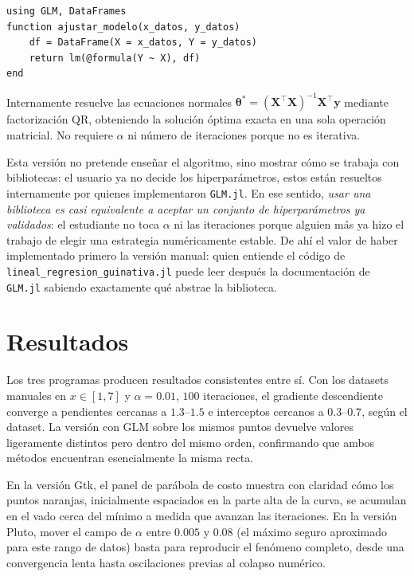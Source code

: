 \documentclass[11pt,a4paper]{article}
\begin{document}
\begin{lstlisting}
using GLM, DataFrames
function ajustar_modelo(x_datos, y_datos)
    df = DataFrame(X = x_datos, Y = y_datos)
    return lm(@formula(Y ~ X), df)
end
\end{lstlisting}

Internamente resuelve las ecuaciones normales $\boldsymbol{\theta}^{*} = (\mathbf{X}^{\top}\mathbf{X})^{-1}\mathbf{X}^{\top}\mathbf{y}$ mediante factorizaci\'on QR, obteniendo la soluci\'on \'optima exacta en una sola operaci\'on matricial. No requiere $\alpha$ ni n\'umero de iteraciones porque no es iterativa.

Esta versi\'on no pretende ense\~nar el algoritmo, sino mostrar c\'omo se trabaja con bibliotecas: el usuario ya no decide los hiperpar\'ametros, estos est\'an resueltos internamente por quienes implementaron \texttt{GLM.jl}. En ese sentido, \emph{usar una biblioteca es casi equivalente a aceptar un conjunto de hiperpar\'ametros ya validados}: el estudiante no toca $\alpha$ ni las iteraciones porque alguien m\'as ya hizo el trabajo de elegir una estrategia num\'ericamente estable. De ah\'i el valor de haber implementado primero la versi\'on manual: quien entiende el c\'odigo de \texttt{lineal\_regresion\_guinativa.jl} puede leer despu\'es la documentaci\'on de \texttt{GLM.jl} sabiendo exactamente qu\'e abstrae la biblioteca.

\section{Resultados}

Los tres programas producen resultados consistentes entre s\'i. Con los datasets manuales en $x \in [1,7]$ y $\alpha = 0.01$, $100$ iteraciones, el gradiente descendiente converge a pendientes cercanas a $1.3$--$1.5$ e interceptos cercanos a $0.3$--$0.7$, seg\'un el dataset. La versi\'on con GLM sobre los mismos puntos devuelve valores ligeramente distintos pero dentro del mismo orden, confirmando que ambos m\'etodos encuentran esencialmente la misma recta.

En la versi\'on Gtk, el panel de par\'abola de costo muestra con claridad c\'omo los puntos naranjas, inicialmente espaciados en la parte alta de la curva, se acumulan en el vado cerca del m\'inimo a medida que avanzan las iteraciones. En la versi\'on Pluto, mover el campo de $\alpha$ entre $0.005$ y $0.08$ (el m\'aximo seguro aproximado para este rango de datos) basta para reproducir el fen\'omeno completo, desde una convergencia lenta hasta oscilaciones previas al colapso num\'erico.
\end{document}
